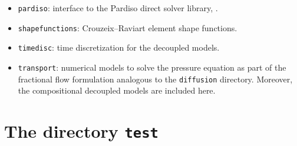 \begin{itemize}
\item \texttt{pardiso}: interface to the Pardiso direct solver library, \cite{Pardiso}. 


\item \texttt{shapefunctions}:  Crouzeix--Raviart element shape functions. 


\item \texttt{timedisc}: time discretization for the decoupled models. 


\item \texttt{transport}: numerical models to solve the pressure equation 
as part of the fractional flow formulation analogous to the \texttt{diffusion} 
directory. Moreover, the compositional decoupled models are included here. 


\end{itemize}



\section{The directory \texttt{test}}\label{sec:test}




